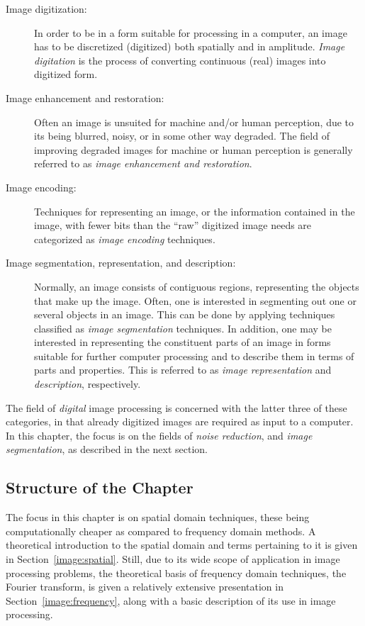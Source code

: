 \begin{description}
\item[Image digitization:] In order to be in a form suitable for
  processing in a computer, an image has to be discretized (digitized)
  both spatially and in amplitude.  {\em Image digitation\/} is the
  process of converting continuous (real) images into digitized form.
\item[Image enhancement and restoration:] Often an image is unsuited
  for machine and/or human perception, due to its being blurred,
  noisy, or in some other way degraded.  The field of improving
  degraded images for machine or human perception is generally
  referred to as {\em image enhancement and restoration\/}.
\item[Image encoding:] Techniques for representing an image, or the
  information contained in the image, with fewer bits than the ``raw''
  digitized image needs are categorized as {\em image encoding\/}
  techniques.
\item[Image segmentation, representation, and description:] Normally,
  an image consists of contiguous regions, representing the objects
  that make up the image.  Often, one is interested in segmenting out
  one or several objects in an image.  This can be done by applying
  techniques classified as {\em image segmentation\/} techniques.  In
  addition, one may be interested in representing the constituent
  parts of an image in forms suitable for further computer processing
  and to describe them in terms of parts and properties.  This is
  referred to as {\em image representation\/} and {\em description\/},
  respectively.
\end{description}

The field of {\em digital\/} image processing is concerned with the
latter three of these categories, in that already digitized images are
required as input to a computer.  In this chapter, the focus is on the
fields of {\em noise reduction\/}, and {\em image segmentation\/}, as
described in the next section.

\subsection{Structure of the Chapter}
\label{image:intro:structure}

The focus in this chapter is on spatial domain techniques, these being
computationally cheaper as compared to frequency domain methods.  A
theoretical introduction to the spatial domain and terms pertaining to
it is given in Section~\ref{image:spatial}.  Still, due to its wide
scope of application in image processing problems, the theoretical
basis of frequency domain techniques, the Fourier transform, is given
a relatively extensive presentation in Section~\ref{image:frequency},
along with a basic description of its use in image processing.

